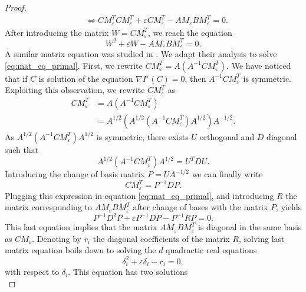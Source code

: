 \documentclass[]{article}
\numberwithin{equation}{section}
\theoremstyle{plain}
\begin{document}
\begin{proof}
\begin{align*}
        & \Leftrightarrow CM_{\varepsilon}^TCM_{\varepsilon}^T+ \varepsilon CM_{\varepsilon}^T- AM_{\varepsilon}BM_{\varepsilon}^T= 0.
    \end{align*}
After introducing the matrix $W = CM_{\varepsilon}^T$, we reach the equation
\begin{equation}\label{eq:mat_eq_primal}
 W^2 + \varepsilon W - AM_{\varepsilon}BM_{\varepsilon}^T= 0.
\end{equation}
A similar matrix equation was studied in \cite[Prop.~3]{janati2020entropic}. We adapt their analysis to solve \eqref{eq:mat_eq_primal}. First, we rewrite $CM_{\varepsilon}^T= A(A^{-1}CM_{\varepsilon}^T)$. We have noticed that if $C$ is solution of the equation $\nabla I^{\varepsilon}(C) = 0$, then $A^{-1}CM_{\varepsilon}^T$ is symmetric. Exploiting this observation, we rewrite $CM_{\varepsilon}^T$ as
\begin{align*}
    CM_{\varepsilon}^T& = A (A^{-1}CM_{\varepsilon}^T)\\
    & = A^{1/2}( A^{1/2} (A^{-1}CM_{\varepsilon}^T) A^{1/2})A^{-1/2}.
\end{align*}
As $A^{1/2} (A^{-1}CM_{\varepsilon}^T) A^{1/2}$ is symmetric, there exists $U$ orthogonal and $D$ diagonal such that 
\begin{equation*}
A^{1/2} (A^{-1}CM_{\varepsilon}^T) A^{1/2} = U^T D U.
\end{equation*}
Introducing the change of basis matrix $P = UA^{-1/2}$ we can finally write 
\begin{equation*}
    CM_{\varepsilon}^T= P^{-1}D P.
\end{equation*}
Plugging this expression in equation \eqref{eq:mat_eq_primal}, and introducing $R$ the matrix corresponding to $AM_{\varepsilon}B M_{\varepsilon}^T$ after change of bases with the matrix $P$, yields
\begin{equation}\label{eq:matrix_equation_diagonal}
    P^{-1}D^2 P + \varepsilon P^{-1}D P - P^{-1}RP = 0.
\end{equation}
This last equation implies that the matrix $AM_{\varepsilon}B M_{\varepsilon}^T$ is diagonal in the same basis as $CM_\varepsilon$. Denoting by $r_i$ the diagonal coefficients of the matrix $R$, solving last matrix equation boils down to solving the $d$ quadractic real equations
\begin{equation}
    \delta_i^2 + \varepsilon \delta_i - r_i = 0,
\end{equation}
with respect to $\delta_i$. This equation has two solutions 
\begin{equation*}

\end{equation*}
\end{proof}
\end{document}

